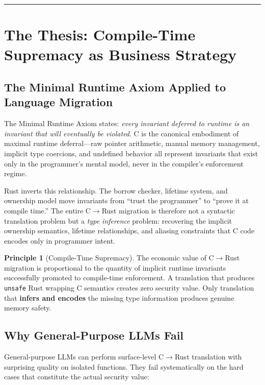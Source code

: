 \documentclass[11pt,a4paper]{article}
\theoremstyle{definition}
\newtheorem{principle}{Principle}[section]
\theoremstyle{remark}
\begin{document}
\vspace{10pt}
\hrule
\vspace{15pt}

\section{The Thesis: Compile-Time Supremacy as Business Strategy}

\subsection{The Minimal Runtime Axiom Applied to Language Migration}

The Minimal Runtime Axiom states: \textit{every invariant deferred to runtime is an invariant that will eventually be violated}. C is the canonical embodiment of maximal runtime deferral---raw pointer arithmetic, manual memory management, implicit type coercions, and undefined behavior all represent invariants that exist only in the programmer's mental model, never in the compiler's enforcement regime.

Rust inverts this relationship. The borrow checker, lifetime system, and ownership model move invariants from ``trust the programmer'' to ``prove it at compile time.'' The entire C$\to$Rust migration is therefore not a syntactic translation problem but a \textit{type inference} problem: recovering the implicit ownership semantics, lifetime relationships, and aliasing constraints that C code encodes only in programmer intent.

\begin{principle}[Compile-Time Supremacy]
The economic value of C$\to$Rust migration is proportional to the quantity of implicit runtime invariants successfully promoted to compile-time enforcement. A translation that produces \texttt{unsafe} Rust wrapping C semantics creates zero security value. Only translation that \textbf{infers and encodes} the missing type information produces genuine memory safety.
\end{principle}

\subsection{Why General-Purpose LLMs Fail}

General-purpose LLMs can perform surface-level C$\to$Rust translation with surprising quality on isolated functions. They fail systematically on the hard cases that constitute the actual security value:
\end{document}
